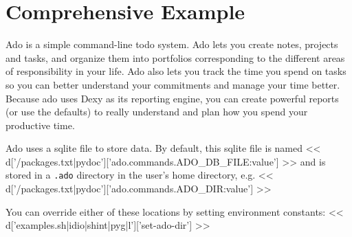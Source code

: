 \documentclass[a4paper]{amsart}
\begin{document}
\section{Comprehensive Example}

Ado is a simple command-line todo system. Ado lets you create notes,
projects and tasks, and organize them into portfolios corresponding to
the different areas of responsibility in your life. Ado also lets you track the
time you spend on tasks so you can better understand your commitments and
manage your time better. Because ado uses Dexy as its reporting engine, you can
create powerful reports (or use the defaults) to really understand and plan how
you spend your productive time.

Ado uses a sqlite file to store data. By default, this sqlite file is named << d['/packages.txt|pydoc']['ado.commands.ADO_DB_FILE:value'] >> and is stored in a \verb|.ado| directory in the user's home directory, e.g.
<< d['/packages.txt|pydoc']['ado.commands.ADO_DIR:value'] >>

You can override either of these locations by setting environment constants:
<< d['examples.sh|idio|shint|pyg|l']['set-ado-dir'] >>
\end{document}
